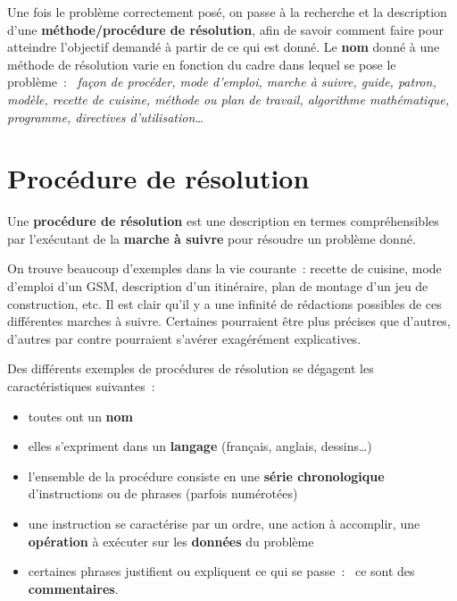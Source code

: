 			Une fois le problème correctement posé, 
			on passe à la recherche et la description 
			d’une \textbf{méthode/procédure de résolution}, 
			afin de savoir comment faire 
			pour atteindre l’objectif demandé 
			à partir de ce qui est donné. 
			Le \textbf{nom} donné à une méthode de résolution 
			varie en fonction du cadre dans lequel se pose le problème~:~
			\textit{façon de procéder, mode d’emploi, marche à suivre, 
			guide, patron, modèle, recette de cuisine, 
			méthode ou plan de travail, algorithme mathématique, 
			programme, directives d’utilisation\dots}
	
	\section{Procédure de résolution}
	
		Une \textbf{procédure de résolution} est une description 
		en termes compréhensibles par l’exécutant 
		de la \textbf{marche à suivre} 
		pour résoudre un problème donné.
		
		On trouve beaucoup d’exemples dans la vie courante~:
		recette de cuisine, mode d’emploi d’un GSM, 
		description d’un itinéraire, 
		plan de montage d’un jeu de construction, etc. 
		Il est clair qu’il y a une infinité de rédactions possibles 
		de ces différentes marches à suivre. 
		Certaines pourraient être plus précises que d’autres,
		d’autres par contre pourraient s’avérer exagérément explicatives.		

		Des différents exemples de procédures de résolution 
		se dégagent les caractéristiques suivantes~:	
		\begin{itemize}
		\item 
			toutes ont un \textbf{nom}
		\item 
			elles s’expriment dans un \textbf{langage}
			(français, anglais, dessins\dots)
		\item 
			l’ensemble de la procédure consiste 
			en une \textbf{série chronologique}
			d’instructions ou de phrases (parfois numérotées)
		\item 
			une instruction se caractérise par un ordre, 
			une action à accomplir,
			une \textbf{opération} à exécuter 
			sur les \textbf{données} du problème
		\item 
			certaines phrases justifient ou expliquent ce qui se passe~:~
			ce sont des \textbf{commentaires}.
		\end{itemize}
	

